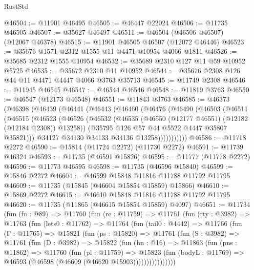 \begin{lexlean}{RustStd}
\begin{coremodule}
@46504 := @11901 @46495
@46505 := @46447 @22024
@46506 := @11735 @46505
@46507 := @35627 @46497
@46511 := @46504 (@46506 @46507) (@12067 @46378)
@46515 := @11901 @46505 @46507 (@12072 @46446)
@46523 := @35676 @1571 @2312 @1555 @11 @4471 @10954 @4066 @1811
@46526 := @35685 @2312 @1555 @10954
@46532 := @35689 @2310 @127 @11 @59 @10952 @5725
@46535 := @35672 @2310 @11 @10952
@46544 := @35676 @2308 @126 @44 @11 @4471 @4447 @4066 @3763 @35713
@46545 := @11749 @2308
@46546 := @11945 @46545
@46547 := @46544 @46546
@46548 := @11819 @3763
@46550 := @46547 (@12173 @46548)
@46551 := @11843 @3763
@46585 := @46373
    (@46398
      (@46439
        (@46441
          (@46443
            (@46460
              (@46476
                (@46490
                  (@46503
                    (@46511
                      (@46515
                        (@46523
                          (@46526
                            (@46532
                              (@46535 (@46550 (@12177 @46551) (@12182 (@12184 @2308)) @13258))
                              (@35795 @126 @57 @44 @5522 @4447 @35807 @35821)))
                          @34127
                          @34130
                          @34133
                          @34136
                          @13258)))))))))))
@46586 := @11718 @2272
@46590 := @15814 (@11724 @2272) (@11730 @2272)
@46591 := @11739 @46324
@46593 := @11735 (@46591 @15826)
@46595 := @11777 (@11778 @2272)
@46596 := @11773 @46595
@46598 := @11735 (@46596 @15840)
@46599 := @15846 @2272
@46604 := @46599 @15848 @11816 @11788 @11792 @11795
@46609 := @11735 (@15845 (@46604 @15854 @15859) @15866)
@46610 := @15869 @2272
@46615 := @46610 @15848 @11816 @11788 @11792 @11795
@46620 := @11735 (@11865 (@46615 @15854 @15859) @4097)
@46651 := @11734
    (fun (fn : @89) =>
    @11760
      (fun (rc : @11759) =>
      @11761
        (fun (rty : @3982) =>
        @11763
          (fun (lets0 : @11762) =>
          @11764
            (fun (tail0 : @4442) =>
            @11766
              (fun (Γ : @11765) =>
              @15821
                (fun (ps : @15820) =>
                @11761
                  (fun (S : @3982) =>
                  @11761
                    (fun (D : @3982) =>
                    @15822
                      (fun (hn : @16) =>
                      @11863
                        (fun (pns : @11862) =>
                        @11760
                          (fun (pl : @11759) =>
                          @15823
                            (fun (bodyL : @11769) =>
                            @46593 (@46598 (@46609 (@46620 @15903))))))))))))))))

\end{coremodule}
\end{lexlean}
